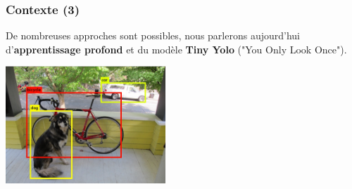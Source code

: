 \documentclass[11pt]{beamer}
\begin{document}
\begin{frame}
\frametitle{Contexte (3)}
De nombreuses approches sont possibles, nous parlerons aujourd'hui d'\textbf{apprentissage profond} et du modèle \textbf{Tiny Yolo} ("You Only Look Once").
\begin{center}
\includegraphics[keepaspectratio=true,width=0.45\textwidth]{images/yolo_works.png}
\hfill
{}
\end{center}
\end{frame}
\end{document}
